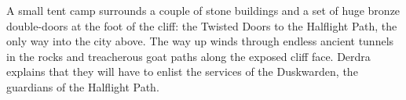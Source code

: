 A small tent camp surrounds a couple of stone buildings and a set of huge bronze double-doors at the foot of the cliff: the Twisted Doors to the Halflight Path, the only way into the city above. The way up winds through endless ancient tunnels in the rocks and treacherous goat paths along the exposed cliff face. Derdra explains that they will have to enlist the services of the Duskwarden, the guardians of the Halflight Path.\\

